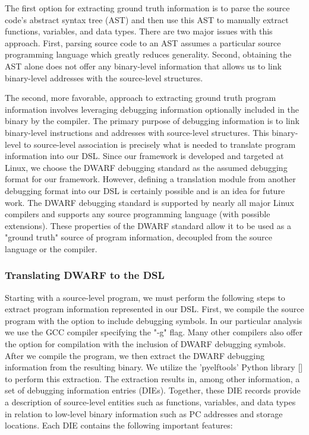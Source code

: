 \documentclass[conference]{IEEEtran}
\begin{document}
The first option for extracting ground truth information is to parse the source code's abstract syntax tree (AST) and then use this AST to manually extract functions, variables, and data types. There are two major issues with this approach. First, parsing source code to an AST assumes a particular source programming language which greatly reduces generality. Second, obtaining the AST alone does not offer any binary-level information that allows us to link binary-level addresses with the source-level structures.

The second, more favorable, approach to extracting ground truth program information involves leveraging debugging information optionally included in the binary by the compiler. The primary purpose of debugging information is to link binary-level instructions and addresses with source-level structures. This binary-level to source-level association is precisely what is needed to translate program information into our DSL. Since our framework is developed and targeted at Linux, we choose the DWARF debugging standard as the assumed debugging format for our framework. However, defining a translation module from another debugging format into our DSL is certainly possible and is an idea for future work. The DWARF debugging standard is supported by nearly all major Linux compilers and supports any source programming language (with possible extensions). These properties of the DWARF standard allow it to be used as a "ground truth" source of program information, decoupled from the source language or the compiler.

\subsubsection{Translating DWARF to the DSL}

Starting with a source-level program, we must perform the following steps to extract program information represented in our DSL. First, we compile the source program with the option to include debugging symbols. In our particular analysis we use the GCC compiler specifying the "-g" flag. Many other compilers also offer the option for compilation with the inclusion of DWARF debugging symbols. After we compile the program, we then extract the DWARF debugging information from the resulting binary. We utilize the 'pyelftools' Python library [] to perform this extraction. The extraction results in, among other information, a set of debugging information entries (DIEs). Together, these DIE records provide a description of source-level entities such as functions, variables, and data types in relation to low-level binary information such as PC addresses and storage locations. Each DIE contains the following important features:
\end{document}

